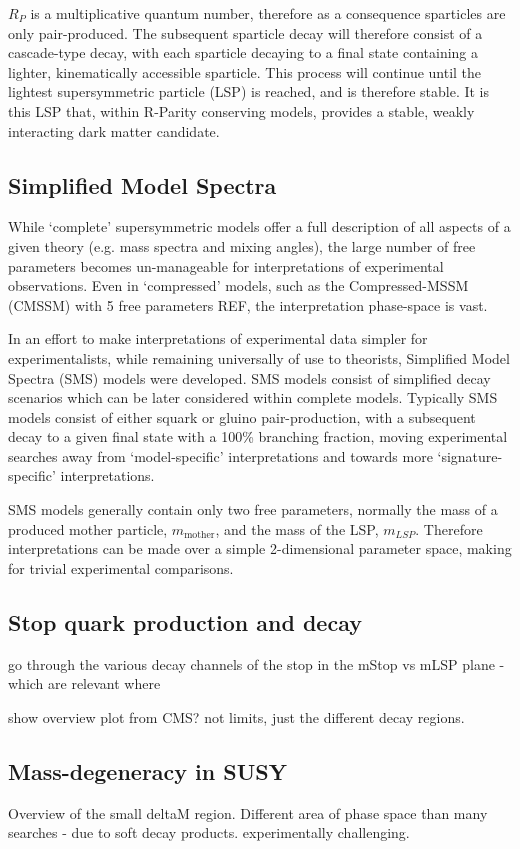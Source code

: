 $R_P$ is a multiplicative quantum number, therefore as a consequence sparticles
are only pair-produced. The subsequent sparticle decay will therefore consist
of a cascade-type decay, with each sparticle decaying to a final state
containing a lighter, kinematically accessible sparticle. This process will
continue until the lightest supersymmetric particle (LSP) is reached, and is
therefore stable. It is this LSP that, within R-Parity conserving models,
provides a stable, weakly interacting dark matter candidate.

\subsection{Simplified Model Spectra}
While `complete' supersymmetric models offer a full description of all
aspects of a given theory (e.g. mass spectra and mixing angles), the large
number of free parameters becomes un-manageable for interpretations
of experimental observations. Even in `compressed' models, such as the
Compressed-MSSM (CMSSM) with 5
free parameters REF, the interpretation phase-space is vast.

In an effort to make interpretations of experimental data simpler for
experimentalists, while remaining universally of use to theorists,
Simplified Model Spectra (SMS) models were developed. SMS models consist of
simplified
decay scenarios which can be later considered within complete models.
Typically SMS models consist of either squark or gluino pair-production, with a
subsequent decay to a given final state with a 100\% branching fraction, moving
experimental searches away from `model-specific' interpretations and
towards more `signature-specific' interpretations.

SMS models generally contain only two free parameters, normally the mass of a
produced mother particle, $m_{\text{mother}}$, and the mass of the LSP,
$m_{LSP}$. Therefore interpretations can be made over a simple 2-dimensional
parameter space, making for trivial experimental comparisons.


\subsection{Stop quark production and decay}
go through the various decay channels of the stop in the mStop vs mLSP plane
- which are relevant where

show overview plot from CMS? not limits, just the different decay regions.

\subsection{Mass-degeneracy in SUSY}
Overview of the small deltaM region. Different area of phase space than many
searches - due to soft decay products. experimentally challenging.


